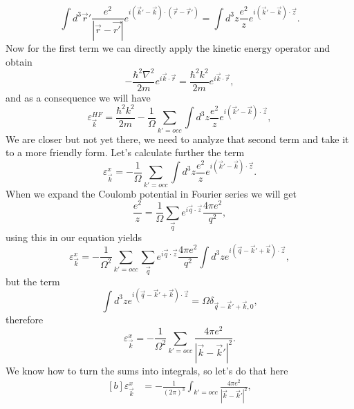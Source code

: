 \begin{questions}
\begin{solution}
\begin{equation}
  \int d^3\vec{r}' \frac{e^2}{|\vec{r} - \vec{r'}|} e^{i(\vec{k}' - \vec{k})\cdot(\vec{r}- \vec{r}')} = \int d^3z \frac{e^2}{z} e^{i(\vec{k}' - \vec{k})\cdot \vec{z}}.
\end{equation}
Now for the first term we can directly apply the kinetic energy operator and obtain
\begin{equation}
  -\frac{\hbar^2 \nabla^2}{2m}  e^{i\vec{k}\cdot \vec{r}} = \frac{\hbar^2 k^2}{2m}  e^{i\vec{k}\cdot \vec{r}},
\end{equation}
and as a consequence we will have
\begin{equation}
  \varepsilon_{\vec{k}}^{HF} = \frac{\hbar^2 k^2}{2m} - \frac{1}{\Omega}\sum_{k'=occ} \int d^3z \frac{e^2}{z} e^{i(\vec{k}' - \vec{k})\cdot \vec{z}},
\end{equation}
We are closer but not yet there, we need to analyze that second term and take it to a more friendly form.
Let's calculate further the term
\begin{equation}
  \varepsilon_{\vec{k}}^x = - \frac{1}{\Omega}\sum_{k'=occ} \int d^3z \frac{e^2}{z} e^{i(\vec{k}' - \vec{k})\cdot \vec{z}}.
\end{equation}
When we expand the Coulomb potential in Fourier series we will get
\begin{equation}
  \frac{e^2}{z} = \frac{1}{\Omega} \sum_{\vec{q}} e^{i\vec{q}\cdot \vec{z}} \frac{4\pi e^2}{q^2},
\end{equation}
using this in our equation yields
\begin{equation}
  \varepsilon_{\vec{k}}^x = - \frac{1}{\Omega^2}\sum_{k'=occ} \sum_{\vec{q}} e^{i\vec{q}\cdot \vec{z}} \frac{4\pi e^2}{q^2} \int d^3z  e^{i(\vec{q} -\vec{k}' + \vec{k})\cdot \vec{z}},
\end{equation}
but the term
\begin{equation}
  \int d^3z  e^{i(\vec{q} -\vec{k}' + \vec{k})\cdot \vec{z}} = \Omega \delta_{\vec{q} -\vec{k}' + \vec{k},0},
\end{equation}
therefore
\begin{equation}
  \varepsilon_{\vec{k}}^x = - \frac{1}{\Omega^2}\sum_{k'=occ} \frac{4\pi e^2}{|\vec{k}-\vec{k}'|^2} .
\end{equation}
We know how to turn the sums into integrals, so let's do that here
\begin{equation}
  \begin{aligned}[b]
    \varepsilon_{\vec{k}}^x &= - \frac{1}{(2\pi)^3}\int_{k'=occ} \frac{4\pi e^2}{|\vec{k}-\vec{k}'|^2}, \\

\end{aligned}
\end{equation}
\end{solution}
\end{questions}
